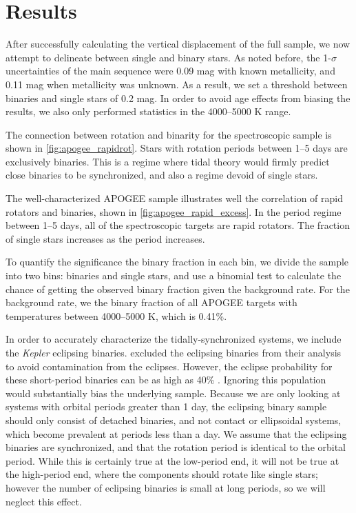 \documentclass[manuscript]{aastex6}
\newcommand{\Kepler}{\mbox{\textit{Kepler}}}
\newcommand{\gvs}{\authorcomment1}
\begin{document}
\section{Results}
\label{sec:results}

\gvs{Under Construction}

After successfully calculating the vertical displacement of the full sample, we
now attempt to delineate between single and binary stars. As noted before, the
1-\(\sigma\) uncertainties of the main sequence were 0.09 mag with known
metallicity, and 0.11 mag when metallicity was unknown. As a result, we set a
threshold between binaries and single stars of 0.2 mag. In order to avoid
age effects from biasing the results, we also only performed statistics in the
4000--5000 K range.

The connection between rotation and binarity for the spectroscopic sample is
shown in \cref{fig:apogee_rapidrot}. Stars with rotation periods between 1--5
days are exclusively binaries. This is a regime where tidal theory would
firmly predict close binaries to be synchronized, and also a regime devoid of
single stars.

The well-characterized APOGEE sample illustrates well the
correlation of rapid rotators and binaries, shown in
\cref{fig:apogee_rapid_excess}. In the period regime between 1--5 days, all of the
spectroscopic targets are rapid rotators. The fraction of single stars
increases as the period increases.

To quantify the significance the binary fraction in each bin, we divide the
sample into two bins: binaries and single stars, and use a binomial test to
calculate the chance of getting the observed binary fraction given the
background rate. For the background rate, we the binary fraction of all APOGEE 
targets with temperatures between 4000--5000 K, which is 0.41\%. 

In order to accurately characterize the tidally-synchronized systems, we
include the \Kepler{} eclipsing binaries. \citep{McQuillan14} excluded the
eclipsing binaries from their analysis to avoid contamination from the
eclipses. However, the eclipse probability for these short-period binaries can
be as high as 40\% \citep{Kirk16}. Ignoring this population would substantially
bias the underlying sample. Because we are only looking at systems with orbital
periods greater than 1 day, the eclipsing binary sample should only consist of
detached binaries, and not contact or ellipsoidal systems, which become
prevalent at periods less than a day. We assume that the eclipsing binaries are
synchronized, and that the rotation period is identical to the orbital period.
While this is certainly true at the low-period end, it will not be true at the
high-period end, where the components should rotate like single stars; 
however the number of eclipsing binaries is small at long periods, so we will
neglect this effect.
\end{document}
